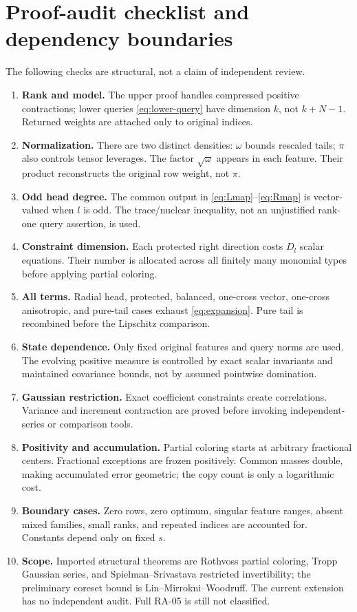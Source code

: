 \documentclass[11pt]{article}
\theoremstyle{remark}\newtheorem{remark}[theorem]{Remark}
\begin{document}
\section{Proof-audit checklist and dependency boundaries}
The following checks are structural, not a claim of independent review.
\begin{enumerate}[leftmargin=*,itemsep=2pt]
\item \textbf{Rank and model.} The upper proof handles compressed positive contractions; lower queries \eqref{eq:lower-query} have dimension $k$, not $k+N-1$. Returned weights are attached only to original indices.
\item \textbf{Normalization.} There are two distinct densities: $\omega$ bounds rescaled tails; $\pi$ also controls tensor leverages. The factor $\sqrt\omega$ appears in each feature. Their product reconstructs the original row weight, not $\pi$.
\item \textbf{Odd head degree.} The common output in \eqref{eq:Lmap}--\eqref{eq:Rmap} is vector-valued when $l$ is odd. The trace/nuclear inequality, not an unjustified rank-one query assertion, is used.
\item \textbf{Constraint dimension.} Each protected right direction costs $D_l$ scalar equations. Their number is allocated across all finitely many monomial types before applying partial coloring.
\item \textbf{All terms.} Radial head, protected, balanced, one-cross vector, one-cross anisotropic, and pure-tail cases exhaust \eqref{eq:expansion}. Pure tail is recombined before the Lipschitz comparison.
\item \textbf{State dependence.} Only fixed original features and query norms are used. The evolving positive measure is controlled by exact scalar invariants and maintained covariance bounds, not by assumed pointwise domination.
\item \textbf{Gaussian restriction.} Exact coefficient constraints create correlations. Variance and increment contraction are proved before invoking independent-series or comparison tools.
\item \textbf{Positivity and accumulation.} Partial coloring starts at arbitrary fractional centers. Fractional exceptions are frozen positively. Common masses double, making accumulated error geometric; the copy count is only a logarithmic cost.
\item \textbf{Boundary cases.} Zero rows, zero optimum, singular feature ranges, absent mixed families, small ranks, and repeated indices are accounted for. Constants depend only on fixed $s$.
\item \textbf{Scope.} Imported structural theorems are Rothvoss partial coloring, Tropp Gaussian series, and Spielman--Srivastava restricted invertibility; the preliminary coreset bound is Lin--Mirrokni--Woodruff. The current extension has no independent audit. Full RA-05 is still not classified.
\end{enumerate}
\end{document}
